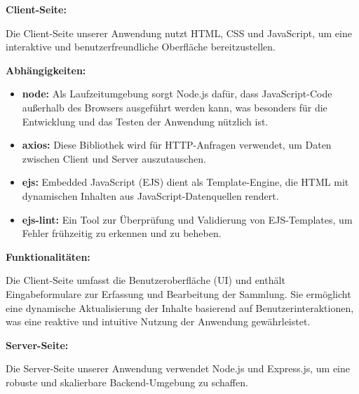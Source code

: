 \textbf{Client-Seite:}

Die Client-Seite unserer Anwendung nutzt HTML, CSS und JavaScript, um eine interaktive und benutzerfreundliche Oberfläche bereitzustellen.

\textbf{Abhängigkeiten:}
    \begin{itemize}
        \item \textbf{node:} Als Laufzeitumgebung sorgt Node.js dafür, dass JavaScript-Code außerhalb des Browsers ausgeführt werden kann, was besonders für die Entwicklung und das Testen der Anwendung nützlich ist.
        \item \textbf{axios:} Diese Bibliothek wird für HTTP-Anfragen verwendet, um Daten zwischen Client und Server auszutauschen.
        \item \textbf{ejs:} Embedded JavaScript (EJS) dient als Template-Engine, die HTML mit dynamischen Inhalten aus JavaScript-Datenquellen rendert.
        \item \textbf{ejs-lint:} Ein Tool zur Überprüfung und Validierung von EJS-Templates, um Fehler frühzeitig zu erkennen und zu beheben.
    \end{itemize}
\item \textbf{Funktionalitäten:}

Die Client-Seite umfasst die Benutzeroberfläche (UI) und enthält Eingabeformulare zur Erfassung und Bearbeitung der Sammlung.
Sie ermöglicht eine dynamische Aktualisierung der Inhalte basierend auf Benutzerinteraktionen, was eine reaktive und intuitive Nutzung der Anwendung gewährleistet.


\textbf{Server-Seite:}

Die Server-Seite unserer Anwendung verwendet Node.js und Express.js, um eine robuste und skalierbare Backend-Umgebung zu schaffen.


